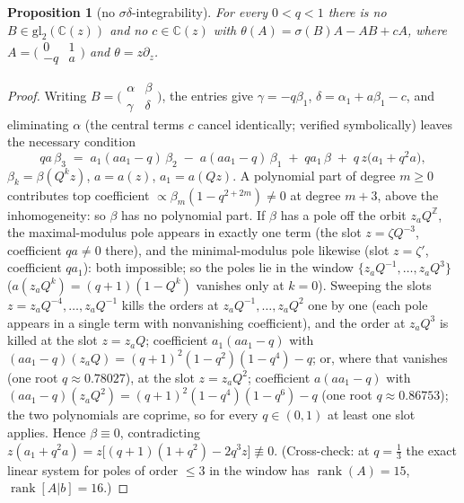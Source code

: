 \documentclass[11pt]{article}
\theoremstyle{plain}
\newtheorem{proposition}[theorem]{Proposition}
\theoremstyle{definition}
\theoremstyle{remark}
\newcommand{\Z}{\mathbb{Z}}
\newcommand{\C}{\mathbb{C}}
\begin{document}
\begin{proposition}[no $\sigma\delta$-integrability]
\label{prop:nonintegrable}
For every $0<q<1$ there is no $B\in\mathrm{gl}_2(\C(z))$ and no $c\in\C(z)$ with
$\theta(A)=\sigma(B)A-AB+cA$, where $A=\bigl(\begin{smallmatrix}0&1\\-q&a\end{smallmatrix}\bigr)$ and
$\theta=z\partial_z$.
\end{proposition}

\begin{proof}
Writing $B=\bigl(\begin{smallmatrix}\alpha&\beta\\\gamma&\delta\end{smallmatrix}\bigr)$, the entries give
$\gamma=-q\beta_1$, $\delta=\alpha_1+a\beta_1-c$, and eliminating $\alpha$ (the central terms $c$
cancel identically; verified symbolically) leaves the necessary condition
\[
   qa\,\beta_3\;=\;a_1(aa_1-q)\,\beta_2\;-\;a(aa_1-q)\,\beta_1\;+\;qa_1\,\beta\;+\;q\,z\bigl(a_1+q^2a\bigr),
\]
$\beta_k=\beta(Q^kz)$, $a=a(z)$, $a_1=a(Qz)$. A polynomial part of degree $m\ge0$ contributes top
coefficient $\propto\beta_m(1-q^{2+2m})\ne0$ at degree $m+3$, above the inhomogeneity: so $\beta$
has no polynomial part. If $\beta$ has a pole off the orbit $z_aQ^{\Z}$, the maximal-modulus pole
appears in exactly one term (the slot $z=\zeta Q^{-3}$, coefficient $qa\ne0$ there), and the
minimal-modulus pole likewise (slot $z=\zeta'$, coefficient $qa_1$): both impossible; so the poles
lie in the window $\{z_aQ^{-1},\dots,z_aQ^{3}\}$ ($a(z_aQ^k)=(q+1)(1-Q^k)$ vanishes only at $k=0$).
Sweeping the slots $z=z_aQ^{-4},\dots,z_aQ^{-1}$ kills the orders at $z_aQ^{-1},\dots,z_aQ^{2}$ one
by one (each pole appears in a single term with nonvanishing coefficient), and the order at
$z_aQ^{3}$ is killed at the slot $z=z_aQ$; coefficient $a_1(aa_1-q)$ with
$(aa_1-q)(z_aQ)=(q+1)^2(1-q^2)(1-q^4)-q$; or, where that vanishes (one root
$q\approx0.78027$), at the slot $z=z_aQ^{2}$; coefficient $a(aa_1-q)$ with
$(aa_1-q)(z_aQ^2)=(q+1)^2(1-q^4)(1-q^6)-q$ (one root $q\approx0.86753$); the two polynomials are
coprime, so for every $q\in(0,1)$ at least one slot applies. Hence $\beta\equiv0$, contradicting
$z(a_1+q^2a)=z\bigl[(q+1)(1+q^2)-2q^3z\bigr]\not\equiv0$. (Cross-check: at $q=\tfrac13$ the exact
linear system for poles of order $\le3$ in the window has $\operatorname{rank}(A)=15$,
$\operatorname{rank}[A|b]=16$.)
\end{proof}
\end{document}
